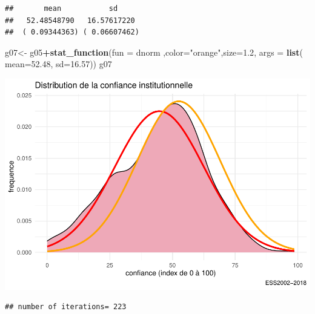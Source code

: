 \documentclass[
]{book}
\newenvironment{Shaded}{\begin{snugshade}}{\end{snugshade}}
\newcommand{\DataTypeTok}[1]{\textcolor[rgb]{0.13,0.29,0.53}{#1}}
\newcommand{\DecValTok}[1]{\textcolor[rgb]{0.00,0.00,0.81}{#1}}
\newcommand{\FloatTok}[1]{\textcolor[rgb]{0.00,0.00,0.81}{#1}}
\newcommand{\KeywordTok}[1]{\textcolor[rgb]{0.13,0.29,0.53}{\textbf{#1}}}
\newcommand{\NormalTok}[1]{#1}
\newcommand{\OperatorTok}[1]{\textcolor[rgb]{0.81,0.36,0.00}{\textbf{#1}}}
\newcommand{\StringTok}[1]{\textcolor[rgb]{0.31,0.60,0.02}{#1}}
\begin{document}
\begin{verbatim}
##       mean           sd     
##   52.48548790   16.57617220 
##  ( 0.09344363) ( 0.06607462)
\end{verbatim}

\begin{Shaded}
\begin{Highlighting}[]
\NormalTok{g07<-}\StringTok{ }\NormalTok{g05}\OperatorTok{+}\KeywordTok{stat_function}\NormalTok{(}\DataTypeTok{fun =}\NormalTok{  dnorm ,}\DataTypeTok{color=}\StringTok{"orange"}\NormalTok{,}\DataTypeTok{size=}\FloatTok{1.2}\NormalTok{, }\DataTypeTok{args =} \KeywordTok{list}\NormalTok{( }\DataTypeTok{mean=}\FloatTok{52.48}\NormalTok{,  }\DataTypeTok{sd=}\FloatTok{16.57}\NormalTok{))}
\NormalTok{g07}
\end{Highlighting}
\end{Shaded}

\includegraphics{bookdown-demo_files/figure-latex/307-1.pdf}

\begin{Shaded}
\end{Shaded}

\begin{verbatim}
## number of iterations= 223
\end{verbatim}

\begin{Shaded}
\end{Shaded}
\end{document}
